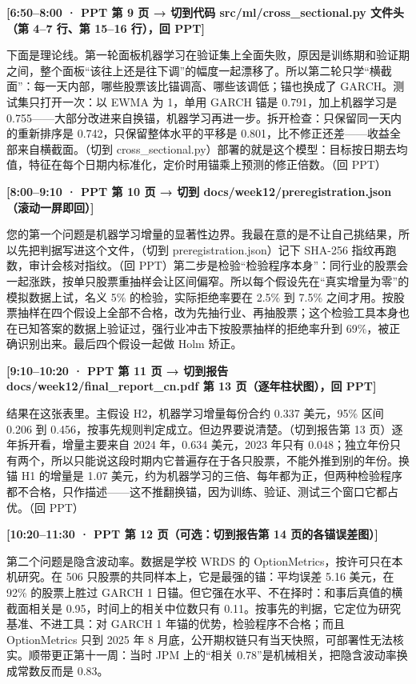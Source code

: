 \documentclass[11pt]{ctexart}
\newcommand{\cue}[1]{\noindent\colorbox{gray!15}{\parbox{\dimexpr\linewidth-2\fboxsep}{\textbf{#1}}}\par\smallskip}
\begin{document}
\cue{[6:50--8:00 · PPT 第 9 页 → 切到代码 src/ml/cross\_sectional.py 文件头（第 4--7 行、第 15--16 行），回 PPT]}
下面是理论线。第一轮面板机器学习在验证集上全面失败，原因是训练期和验证期之间，整个面板“该往上还是往下调”的幅度一起漂移了。所以第二轮只学“横截面”：每一天内部，哪些股票该比锚调高、哪些该调低；锚也换成了 GARCH。测试集只打开一次：以 EWMA 为 1，单用 GARCH 锚是 0.791，加上机器学习是 0.755——大部分改进来自换锚，机器学习再进一步。拆开检查：只保留同一天内的重新排序是 0.742，只保留整体水平的平移是 0.801，比不修正还差——收益全部来自横截面。（切到 cross\_sectional.py）部署的就是这个模型：目标按日期去均值，特征在每个日期内标准化，定价时用锚乘上预测的修正倍数。（回 PPT）

\cue{[8:00--9:10 · PPT 第 10 页 → 切到 docs/week12/preregistration.json（滚动一屏即回）]}
您的第一个问题是机器学习增量的显著性边界。我最在意的是不让自己挑结果，所以先把判据写进这个文件，（切到 preregistration.json）记下 SHA-256 指纹再跑数，审计会核对指纹。（回 PPT）第二步是检验“检验程序本身”：同行业的股票会一起涨跌，按单只股票重抽样会让区间偏窄。所以每个假设先在“真实增量为零”的模拟数据上试，名义 5\% 的检验，实际拒绝率要在 2.5\% 到 7.5\% 之间才用。按股票抽样在四个假设上全部不合格，改为先抽行业、再抽股票；这个检验工具本身也在已知答案的数据上验证过，强行业冲击下按股票抽样的拒绝率升到 69\%，被正确识别出来。最后四个假设一起做 Holm 矫正。

\cue{[9:10--10:20 · PPT 第 11 页 → 切到报告 docs/week12/final\_report\_cn.pdf 第 13 页（逐年柱状图），回 PPT]}
结果在这张表里。主假设 H2，机器学习增量每份合约 0.337 美元，95\% 区间 0.206 到 0.456，按事先规则判定成立。但边界要说清楚。（切到报告第 13 页）逐年拆开看，增量主要来自 2024 年，0.634 美元，2023 年只有 0.048；独立年份只有两个，所以只能说这段时期内它普遍存在于各只股票，不能外推到别的年份。换锚 H1 的增量是 1.07 美元，约为机器学习的三倍、每年都为正，但两种检验程序都不合格，只作描述——这不推翻换锚，因为训练、验证、测试三个窗口它都占优。（回 PPT）

\cue{[10:20--11:30 · PPT 第 12 页（可选：切到报告第 14 页的各锚误差图）]}
第二个问题是隐含波动率。数据是学校 WRDS 的 OptionMetrics，按许可只在本机研究。在 506 只股票的共同样本上，它是最强的锚：平均误差 5.16 美元，在 92\% 的股票上胜过 GARCH 1 日锚。但它强在水平、不在择时：和事后真值的横截面相关是 0.95，时间上的相关中位数只有 0.11。按事先的判据，它定位为研究基准、不进工具：对 GARCH 1 年锚的优势，检验程序不合格；而且 OptionMetrics 只到 2025 年 8 月底，公开期权链只有当天快照，可部署性无法核实。顺带更正第十一周：当时 JPM 上的“相关 0.78”是机械相关，把隐含波动率换成常数反而是 0.83。
\end{document}
